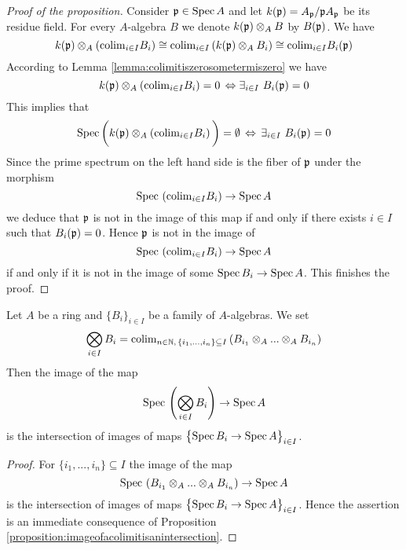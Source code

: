 \begin{proof}[Proof of the proposition]
Consider $\mathfrak{p}\in \mathrm{Spec}\, A$ and let $k(\mathfrak{p}) = A_{\mathfrak{p}}/\mathfrak{p}A_{\mathfrak{p}}$ be its residue field. For every $A$-algebra $B$ we denote $k(\mathfrak{p})\otimes_AB$ by $B(\mathfrak{p})$. We have
$$k(\mathfrak{p})\otimes_A \left(\mathrm{colim}_{i\in I}B_i\right) \cong \mathrm{colim}_{i\in I}\left(k(\mathfrak{p})\otimes_AB_i\right)\cong \mathrm{colim}_{i\in I}B_i(\mathfrak{p})$$
According to Lemma \ref{lemma:colimitiszerosometermiszero} we have 
$$k(\mathfrak{p})\otimes_A \left(\mathrm{colim}_{i\in I}B_i\right) = 0\, \Leftrightarrow \exists_{i\in I}\,\,B_{i}(\mathfrak{p}) = 0$$
This implies that 
$$\mathrm{Spec}\, \bigg(k(\mathfrak{p})\otimes_A \left(\mathrm{colim}_{i\in I}B_i\right)\bigg) = \emptyset\,\Leftrightarrow\,\exists_{i\in I}\,\,B_{i}(\mathfrak{p}) = 0$$
Since the prime spectrum on the left hand side is the fiber of $\mathfrak{p}$ under the morphism 
$$\mathrm{Spec}\, \left(\mathrm{colim}_{i\in I}B_i\right)\rightarrow \mathrm{Spec}\, A$$
we deduce that $\mathfrak{p}$ is not in the image of this map if and only if there exists $i\in I$ such that $B_i(\mathfrak{p}) = 0$. Hence $\mathfrak{p}$ is not in the image of 
$$\mathrm{Spec}\, \left(\mathrm{colim}_{i\in I}B_i\right)\rightarrow \mathrm{Spec}\, A$$
if and only if it is not in the image of some $\mathrm{Spec}\, B_i\rightarrow \mathrm{Spec}\, A$. This finishes the proof.
\end{proof}

\begin{corollary}\label{corollary:intersectionsofimages}
Let $A$ be a ring and $\{B_i\}_{i\in I}$ be a family of $A$-algebras. We set
$$\bigotimes_{i\in I}B_i = \mathrm{colim}_{n\in {\mathbb N},\,\{i_1,...,i_n\}\subseteq I}\left(B_{i_1}\otimes_A...\otimes_AB_{i_n}\right)$$
Then the image of the map
$$\mathrm{Spec}\, \left(\bigotimes_{i\in I}B_i\right)\rightarrow \mathrm{Spec}\, A$$
is the intersection of images of maps $\big\{\mathrm{Spec}\, B_i\rightarrow \mathrm{Spec}\, A\big\}_{i\in I}$.
\end{corollary}
\begin{proof}
For $\{i_1,...,i_n\}\subseteq I$ the image of the map
$$\mathrm{Spec}\, \left(B_{i_1}\otimes_A...\otimes_AB_{i_n}\right)\rightarrow \mathrm{Spec}\, A$$
is the intersection of images of maps $\big\{\mathrm{Spec}\, B_i \rightarrow \mathrm{Spec}\, A\big\}_{i\in I}$. Hence the assertion is an immediate consequence of Proposition \ref{proposition:imageofacolimitisanintersection}. 
\end{proof}

